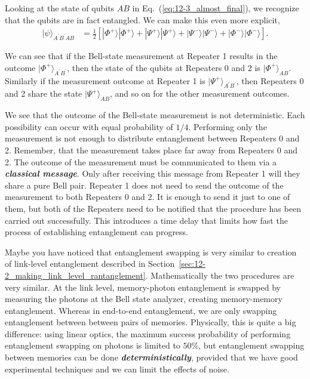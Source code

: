 Looking at the state of qubits $AB$ in Eq.~(\ref{eq:12-3_almost_final}), we recognize that the qubits are in fact entangled.
We can make this even more explicit,
\begin{align}
    |\psi\rangle_{A^{\prime}B^{\prime}AB} & = \frac{1}{2} \left[ |\Phi^+\rangle |\Phi^+\rangle + |\Psi^+\rangle |\Psi^+\rangle + |\Psi^-\rangle |\Psi^-\rangle + |\Phi^-\rangle |\Phi^-\rangle \right].
    \label{eq:12-3_final}
\end{align}

We can see that if the Bell-state measurement at Repeater 1 results in the outcome $|\Phi^+\rangle_{A^{\prime}B^{\prime}}$, then the state of the qubits at Repeaters 0 and 2 is $|\Phi^+\rangle_{AB}$.
Similarly if the measurement outcome at Repeater 1 is $|\Psi^+\rangle_{A^{\prime}B^{\prime}}$, then Repeaters 0 and 2 share the state $|\Psi^+\rangle_{AB}$, and so on for the other measurement outcomes.

We see that the outcome of the Bell-state measurement is not deterministic.
Each possibility can occur with equal probability of $1/4$.
Performing only the measurement is not enough to distribute entanglement between Repeaters 0 and 2.
Remember, that the measurement takes place far away from Repeaters 0 and 2.
The outcome of the measurement must be communicated to them via a \emph{\textbf{classical message}}.
Only after receiving this message from Repeater 1 will they share a pure Bell pair.
Repeater 1 does not need to send the outcome of the measurement to both Repeaters 0 and 2.
It is enough to send it just to one of them, but both of the Repeaters need to be notified that the procedure has been carried out successfully.
This introduces a time delay that limits how fast the process of establishing entanglement can progress.

Maybe you have noticed that entanglement swapping is very similar to creation of link-level entanglement described in Section~\ref{sec:12-2_making_link_level_rantanglement}.
Mathematically the two procedures are very similar.
At the  link level, memory-photon entanglement is swapped by measuring the photons at the Bell state analyzer, creating memory-memory entanglement.
Whereas in end-to-end entanglement, we are only swapping entanglement between between pairs of memories.
Physically, this is quite a big difference: using linear optics, the maximum success probability of performing entanglement swapping on photons is limited to $50\%$, but entanglement swapping between memories can be done \textbf{\emph{deterministically}}, provided that we have good experimental techniques and we can limit the effects of noise.

